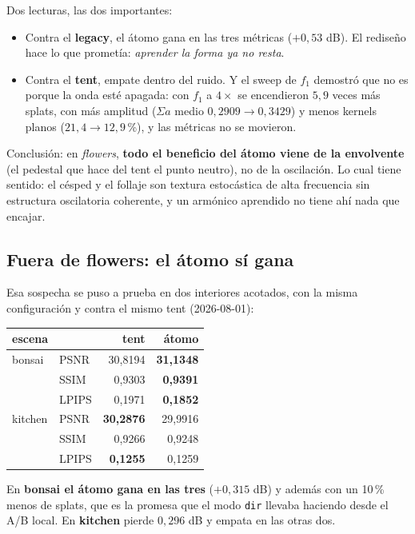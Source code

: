 \documentclass[12pt]{extarticle}
\newcommand{\ssum}{\Sigma a}
\newcommand{\code}[1]{\texttt{#1}}
\begin{document}
Dos lecturas, las dos importantes:

\begin{itemize}
\item Contra el \textbf{legacy}, el átomo gana en las tres métricas
      ($+0{,}53$ dB). El rediseño hace lo que prometía: \emph{aprender la forma
      ya no resta}.
\item Contra el \textbf{tent}, empate dentro del ruido. Y el sweep de $f_1$
      demostró que no es porque la onda esté apagada: con $f_1$ a $4\times$ se
      encendieron $5{,}9$ veces más splats, con más amplitud
      ($\ssum$ medio $0{,}2909\to0{,}3429$) y menos kernels planos
      ($21{,}4 \to 12{,}9$\,\%), y las métricas no se movieron.
\end{itemize}

Conclusión: en \emph{flowers}, \textbf{todo el beneficio del átomo viene de la
envolvente} (el pedestal que hace del tent el punto neutro), no de la
oscilación. Lo cual tiene sentido: el césped y el follaje son textura
estocástica de alta frecuencia sin estructura oscilatoria coherente, y un
armónico aprendido no tiene ahí nada que encajar.

\subsection{Fuera de flowers: el átomo sí gana}

Esa sospecha se puso a prueba en dos interiores acotados, con la misma
configuración y contra el mismo tent (2026-08-01):

\begin{center}\small
\begin{tabular}{@{}llrr@{}}
\toprule
\textbf{escena} & & \textbf{tent} & \textbf{átomo} \\
\midrule
bonsai  & PSNR  & 30,8194 & \textbf{31,1348} \\
        & SSIM  & 0,9303  & \textbf{0,9391} \\
        & LPIPS & 0,1971  & \textbf{0,1852} \\
\midrule
kitchen & PSNR  & \textbf{30,2876} & 29,9916 \\
        & SSIM  & 0,9266  & 0,9248 \\
        & LPIPS & \textbf{0,1255}  & 0,1259 \\
\bottomrule
\end{tabular}
\end{center}

En \textbf{bonsai el átomo gana en las tres} ($+0{,}315$ dB) y además con un
10\,\% menos de splats, que es la promesa que el modo \code{dir} llevaba
haciendo desde el A/B local. En \textbf{kitchen} pierde $0{,}296$ dB y empata en
las otras dos.
\end{document}
